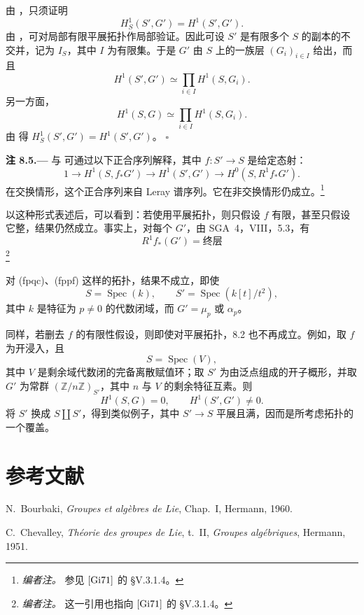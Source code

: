 由 ，只须证明
\[
  H^1_S(S',G')=H^1(S',G').
\]
由 ，可对局部有限平展拓扑作局部验证。因此可设 \(S'\) 是有限多个 \(S\) 的副本的不交并，记为 \(I_S\)，其中 \(I\) 为有限集。于是 \(G'\) 由 \(S\) 上的一族层 \((G_i)_{i\in I}\) 给出，而且
\[
  H^1(S',G')
  \simeq
  \prod_{i\in I}H^1(S,G_i).
\]
另一方面，
\[
  H^1(S,G)
  \simeq
  \prod_{i\in I}H^1(S,G_i).
\]
由  得 \(H^1_S(S',G')=H^1(S',G')\)。
\hfill\(\square\)

\par\medskip\noindent{}\textbf{注 8.5.---}\enspace
{} 与  可通过以下正合序列解释，其中 \(f:S'\to S\) 是给定态射：
\[
  1\longrightarrow H^1(S,f_*G')
  \longrightarrow H^1(S',G')
  \longrightarrow H^0(S,R^1f_*G').
\]
在交换情形，这个正合序列来自 Leray 谱序列。它在非交换情形仍成立。\footnote{\textit{编者注。} 参见 \([{\rm Gi71}]\) 的 \S V.3.1.4。}

以这种形式表述后，可以看到：若使用平展拓扑，则只假设 \(f\) 有限，甚至只假设它整，结果仍然成立。事实上，对每个 \(G'\)，由 SGA~4，VIII，5.3，有
\[
  R^1f_*(G')=\text{终层}
\]
\footnote{\textit{编者注。} 这一引用也指向 \([{\rm Gi71}]\) 的 \S V.3.1.4。}

对 \textup{(fpqc)}、\textup{(fppf)} 这样的拓扑，结果不成立，即使
\[
  S=\operatorname{Spec}(k),
  \qquad
  S'=\operatorname{Spec}(k[t]/t^2),
\]
其中 \(k\) 是特征为 \(p\neq0\) 的代数闭域，而 \(G'=\mu_p\) 或 \(\alpha_p\)。

同样，若删去 \(f\) 的有限性假设，则即使对平展拓扑，8.2 也不再成立。例如，取 \(f\) 为开浸入，且
\[
  S=\operatorname{Spec}(V),
\]
其中 \(V\) 是剩余域代数闭的完备离散赋值环；取 \(S'\) 为由泛点组成的开子概形，并取 \(G'\) 为常群 \((\mathbb Z/n\mathbb Z)_{S'}\)，其中 \(n\) 与 \(V\) 的剩余特征互素。则
\[
  H^1(S,G)=0,
  \qquad
  H^1(S',G')\neq0.
\]
将 \(S'\) 换成 \(S\amalg S'\)，得到类似例子，其中 \(S'\to S\) 平展且满，因而是所考虑拓扑的一个覆盖。

\section*{参考文献}
\noindent[BLie]\enspace
N.~Bourbaki, \textit{Groupes et algèbres de Lie}, Chap.~I, Hermann,
1960.\par

\smallskip\noindent[Ch51]\enspace
C.~Chevalley, \textit{Théorie des groupes de Lie}, t.~II,
\textit{Groupes algébriques}, Hermann, 1951.\par

